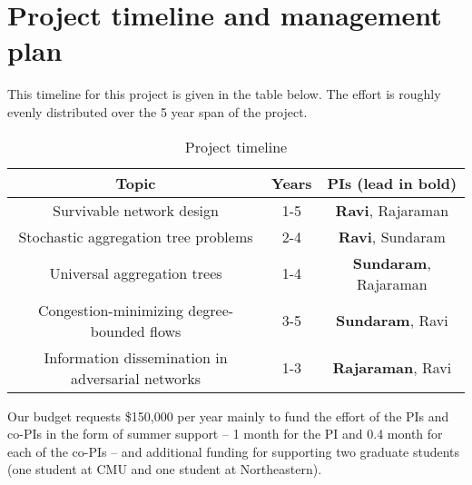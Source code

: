 \section{Project timeline and management plan}

This timeline for this project is given in the table below.  The
effort is roughly evenly distributed over the 5 year span of the
project.

\begin{table}[h]
\begin{tabular}{||c|c|c||}
\hline\hline
{\bf Topic} & {\bf Years} & {\bf PIs (lead in bold)}\\\hline\hline
Survivable network design & 1-5 & {\bf Ravi}, Rajaraman\\\hline
Stochastic aggregation tree problems & 2-4 & {\bf Ravi}, Sundaram\\\hline
Universal aggregation trees  & 1-4 & {\bf Sundaram}, Rajaraman\\ \hline
Congestion-minimizing degree-bounded flows & 3-5 & {\bf Sundaram}, Ravi\\ \hline
Information dissemination in adversarial networks & 1-3 & {\bf Rajaraman}, Ravi\\ \hline
\end{tabular}
\caption{Project timeline}
\end{table}


Our budget requests \$150,000 per year mainly to fund the effort of
the PIs and co-PIs in the form of summer support -- 1 month for the PI
and 0.4 month for each of the co-PIs -- and additional funding for
supporting two graduate students (one student at CMU and one student
at Northeastern).  

